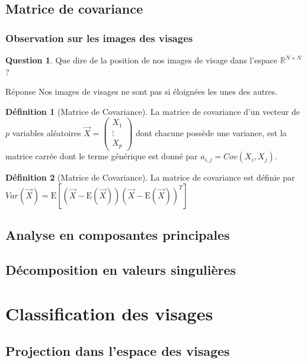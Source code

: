 \documentclass{beamer}
\theoremstyle{plain}
\theoremstyle{definition}
\newtheorem{defi}{Définition}
\newtheorem{qst}{Question}
\begin{document}
\subsection{Matrice de covariance}

\begin{frame}  
  \frametitle{Observation sur les images des visages}
  \begin{qst}
    Que dire de la position de nos images de visage dans l'espace $\mathbb{R}^{N \times N}$?
  \end{qst}
  \pause
  \begin{exampleblock}{Réponse}
    Nos images de visages ne sont pas si éloignées les unes des autres. 
  \end{exampleblock}
\end{frame}


\begin{frame}
\begin{defi}[Matrice de Covariance]
  La matrice de covariance d'un vecteur de $p$ variables aléatoires $\overrightarrow{X} =
  \begin{pmatrix}
    X_1 \\
    \vdots \\
    X_p
  \end{pmatrix}$ dont chacune possède une variance, est la matrice carrée dont le terme générique est donné par $a_{i,j} = Cov(X_i,X_j)$.
\end{defi}

\begin{defi}[Matrice de Covariance]
  La matrice de covariance est définie par $Var(\overrightarrow{X}) = \mathrm{E}[ (\overrightarrow{X}-\mathrm{E}(\overrightarrow{X})) (\overrightarrow{X}-\mathrm{E}(\overrightarrow{X}))^T]$
\end{defi}
\end{frame}


\subsection{Analyse en composantes principales}
\subsection{Décomposition en valeurs singulières}

\section{Classification des visages}
\subsection{Projection dans l'espace des visages}
\end{document}
